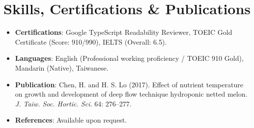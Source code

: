 \documentclass[10pt,a4paper]{article}
\begin{document}
\section{Skills, Certifications \& Publications}
\begin{itemize}
    \item \textbf{Certifications}: Google TypeScript Readability Reviewer, TOEIC Gold Certificate (Score: 910/990), IELTS (Overall: 6.5).
    \item \textbf{Languages}: English (Professional working proficiency / TOEIC 910 Gold), Mandarin (Native), Taiwanese.
    \item \textbf{Publication}: Chen, H. and H. S. Lo (2017). Effect of nutrient temperature on growth and development of deep flow technique hydroponic netted melon. \textit{J. Taiw. Soc. Hortic. Sci.} 64: 276--277.
    \item \textbf{References}: Available upon request.
\end{itemize}
\end{document}
